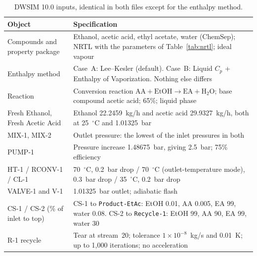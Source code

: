 \documentclass[10pt,a4paper]{article}
\newcommand{\hdrrow}{}
\begin{document}
\begin{table}[H]
\centering
\caption{DWSIM 10.0 inputs, identical in both files except for the enthalpy method.}
\label{tab:dwsim_inputs}
\small
\begin{tabularx}{\textwidth}{|L{4.2cm}|Y|}
\hline
\hdrrow
\textbf{Object} & \textbf{Specification} \\
\hline
Compounds and property package & Ethanol, acetic acid, ethyl acetate, water (ChemSep); NRTL with the parameters of Table~\ref{tab:nrtl}; ideal vapour \\
\hline
Enthalpy method & Case~A: Lee--Kesler (default). Case~B: Liquid $C_p$ + Enthalpy of Vaporization. Nothing else differs \\
\hline
Reaction & Conversion reaction $\mathrm{AA + EtOH \to EA + H_2O}$; base compound acetic acid; 65\%; liquid phase \\
\hline
Fresh Ethanol, Fresh Acetic Acid & Ethanol 22.2459~kg/h and acetic acid 29.9327~kg/h, both at 25~$^\circ$C and 1.01325~bar \\
\hline
MIX-1, MIX-2 & Outlet pressure: the lowest of the inlet pressures in both \\
\hline
PUMP-1 & Pressure increase 1.48675~bar, giving 2.5~bar; 75\% efficiency \\
\hline
HT-1 / RCONV-1 / CL-1 & 70~$^\circ$C, 0.2~bar drop / 70~$^\circ$C (outlet-temperature mode), 0.3~bar drop / 35~$^\circ$C, 0.2~bar drop \\
\hline
VALVE-1 and V-1 & 1.01325~bar outlet; adiabatic flash \\
\hline
CS-1 / CS-2 (\% of inlet to top) & CS-1 to \texttt{Product-EtAc}: EtOH 0.01, AA 0.005, EA 99, water 0.08. CS-2 to \texttt{Recycle-1}: EtOH 99, AA 90, EA 99, water 30 \\
\hline
R-1 recycle & Tear at stream~20; tolerance $1 \times 10^{-8}$~kg/s and 0.01~K; up to 1,000 iterations; no acceleration \\
\hline
\end{tabularx}
\end{table}
\end{document}
